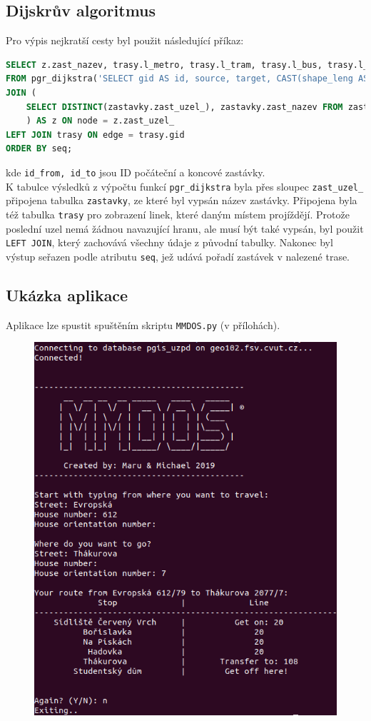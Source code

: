 \documentclass[a4paper, 12pt]{article}
\begin{document}
\subsection{Dijskrův algoritmus}
Pro výpis nejkratší cesty byl použit následující příkaz:
\begin{lstlisting}[language=SQL]
SELECT z.zast_nazev, trasy.l_metro, trasy.l_tram, trasy.l_bus, trasy.l_lan, trasy.l_vlak, trasy.l_lod, node
FROM pgr_dijkstra('SELECT gid AS id, source, target, CAST(shape_leng AS REAL) AS cost FROM trasy', id_from, id_to)
JOIN (
	SELECT DISTINCT(zastavky.zast_uzel_), zastavky.zast_nazev FROM zastavky
	) AS z ON node = z.zast_uzel_
LEFT JOIN trasy ON edge = trasy.gid 
ORDER BY seq;
\end{lstlisting}
kde \texttt{id\_from, id\_to} jsou ID počáteční a koncové zastávky. \\
K tabulce výsledků z výpočtu funkcí \texttt{pgr\_dijkstra} byla přes sloupec \texttt{zast\_uzel\_} připojena tabulka \texttt{zastavky}, ze které byl vypsán název zastávky. Připojena byla též tabulka \texttt{trasy} pro zobrazení linek, které daným místem projíždějí. Protože poslední uzel nemá žádnou navazující hranu, ale musí být také vypsán, byl použit \texttt{LEFT JOIN}, který zachovává všechny údaje z původní tabulky. Nakonec byl výstup seřazen podle atributu \texttt{seq}, jež udává pořadí zastávek v nalezené trase.
\newpage
\subsection{Ukázka aplikace}
Aplikace lze spustit spuštěním skriptu \texttt{MMDOS.py} (v přílohách).
\begin{figure}[h!]
 \centering
 \includegraphics[scale=0.5]{ukazka.png}
\end{figure}
\end{document}
